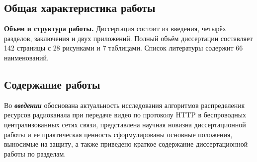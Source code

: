 \subsection*{Общая характеристика работы}

\newcommand{\actuality}{{\textbf{Актуальность темы.}}}
\newcommand{\aim}{{\textbf{Целью}}}
\newcommand{\tasks}{{\textbf{задачи}}}
\newcommand{\defpositions}{{\textbf{Основные положения, выносимые на~защиту:}}}
\newcommand{\novelty}{{\textbf{Научная новизна:}}}
\newcommand{\influence}{{\textbf{Практическая значимость}}}
\newcommand{\reliability}{{\textbf{Достоверность}}}
\newcommand{\probation}{{\textbf{Апробация работы.}}}
\newcommand{\contribution}{{\textbf{Личный вклад.}}}
\newcommand{\publications}{{\textbf{Публикации.}}}

\newtheorem{theorem}{Теорема}
\newtheorem{definition}[theorem]{Определение}
\newtheorem{assumption}[theorem]{Допущение}
\newtheorem{assumptionext}[theorem]{Допущение}
\newtheorem{lemma}[theorem]{Утверждение}




{\textbf{Объем и структура работы.}} Диссертация состоит из введения, четырёх разделов, заключения и двух приложений. Полный объём диссертации составляет 142 страницы с 28 рисунками и 7 таблицами. Список литературы содержит 66 наименований.

\subsection*{Содержание работы}
Во \textbf{\textit{введении}} обоснована актуальность исследования алгоритмов распределения ресурсов радиоканала при передаче видео по протоколу HTTP в беспроводных централизованных сетях связи, представлена научная новизна диссертационной работы и ее практическая ценность сформулированы основные положения, выносимые на защиту, а также приведено краткое содержание диссертационной работы по разделам.


